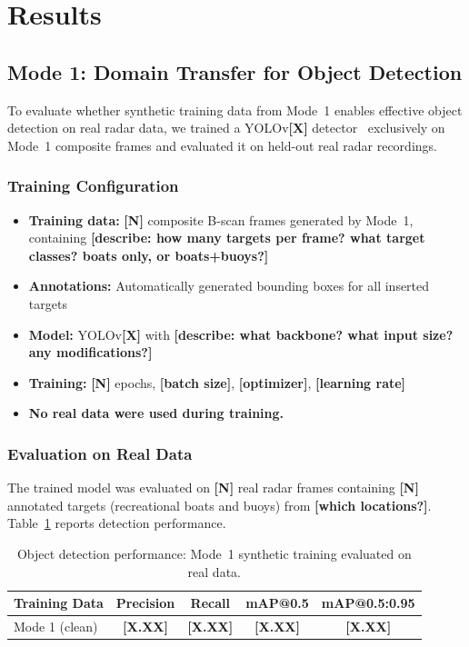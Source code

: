 \documentclass[conf]{new-aiaa}
\newcommand{\ph}[1]{\textbf{[#1]}}
\begin{document}
\section{Results}
\label{sec:results}

\subsection{Mode 1: Domain Transfer for Object Detection}

To evaluate whether synthetic training data from Mode~1 enables effective object detection on real radar data, we trained a YOLOv\ph{X} detector~\cite{jocher2023yolov8} exclusively on Mode~1 composite frames and evaluated it on held-out real radar recordings.

\subsubsection{Training Configuration}

\begin{itemize}
    \item \textbf{Training data:} \ph{N} composite B-scan frames generated by Mode~1, containing \ph{describe: how many targets per frame? what target classes? boats only, or boats+buoys?}
    \item \textbf{Annotations:} Automatically generated bounding boxes for all inserted targets
    \item \textbf{Model:} YOLOv\ph{X} with \ph{describe: what backbone? what input size? any modifications?}
    \item \textbf{Training:} \ph{N} epochs, \ph{batch size}, \ph{optimizer}, \ph{learning rate}
    \item \textbf{No real data were used during training.}
\end{itemize}

\subsubsection{Evaluation on Real Data}

The trained model was evaluated on \ph{N} real radar frames containing \ph{N} annotated targets (recreational boats and buoys) from \ph{which locations?}. Table~\ref{tab:yolo_results} reports detection performance.

\begin{table}[htb]
\centering
\caption{Object detection performance: Mode~1 synthetic training evaluated on real data.}
\label{tab:yolo_results}
\begin{tabular}{@{}lcccc@{}}
\toprule
\textbf{Training Data} & \textbf{Precision} & \textbf{Recall} & \textbf{mAP@0.5} & \textbf{mAP@0.5:0.95} \\
\midrule
Mode 1 (clean) & \ph{X.XX} & \ph{X.XX} & \ph{X.XX} & \ph{X.XX} \\
\bottomrule
\end{tabular}
\end{table}
\end{document}
